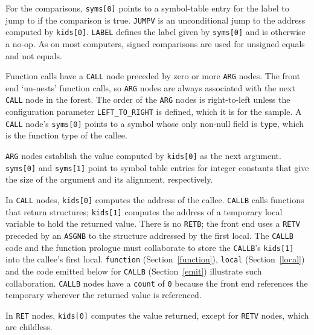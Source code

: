 For the comparisons, \verb|syms[0]| points to a symbol-table entry for
the label to jump to if the comparison is true.  \verb|JUMPV| is an
unconditional jump to the address computed by \verb|kids[0]|. \verb|LABEL|
defines the label given by \verb|syms[0]| and is otherwise a no-op.
As on most computers, signed comparisons are used for unsigned equals and not equals. 

Function calls have a \verb|CALL| node preceded by zero or more
\verb|ARG| nodes. The front end `un-nests'
function calls, so \verb|ARG| nodes are always associated with the next
\verb|CALL| node in the forest. The order of the \verb|ARG| nodes is
right-to-left unless the configuration parameter \verb|LEFT_TO_RIGHT|
is defined, which it is for the sample.
A \verb|CALL| node's \verb|syms[0]| points to a symbol
whose only non-null field is \verb|type|,
which is the function type of the callee.

\verb|ARG| nodes establish the value computed by \verb|kids[0]| as the
next argument.  \verb|syms[0]| and \verb|syms[1]| point to symbol table
entries for integer constants that give the size of the argument and
its alignment, respectively.

\label{dags:calls}

In \verb|CALL| nodes, \verb|kids[0]| computes the address of the callee.
\verb|CALLB| calls functions that return structures;
\verb|kids[1]| computes the address of a
temporary local variable to hold the returned value. There is no
\verb|RETB|; the front end uses a \verb|RETV| preceded by an
\verb|ASGNB| to the structure addressed by the first local. The
\verb|CALLB| code and the function prologue must collaborate to store the
\verb|CALLB|'s \verb|kids[1]| into the callee's first local.
\verb|function| (Section~\ref{function}), \verb|local| (Section~\ref{local})
and the code emitted below for \verb|CALLB| (Section~\ref{emit})
illustrate such collaboration.
\verb|CALLB| nodes have a \verb|count| of \verb|0| because the front end references
the temporary wherever the returned value is referenced.

In \verb|RET| nodes, \verb|kids[0]| computes the value returned, except
for \verb|RETV| nodes, which are childless.

